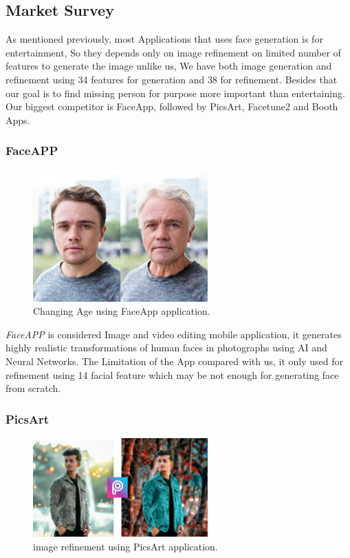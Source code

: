 \subsection{Market Survey}

As mentioned previously, most Applications that uses face generation is for entertainment, So they depends only on image refinement on limited number of features to generate the image unlike us, We have both image generation and refinement using 34 features for generation and 38 for refinement.
Besides that our goal is to find missing person for purpose more important than entertaining. Our biggest competitor is FaceApp, followed by PicsArt, Facetune2 and Booth Apps.
  

\subsubsection{FaceAPP}

\begin{figure}[H]
    \centering
    \includegraphics[width=0.6\textwidth]{images/FaceApp.jpg}
    \caption{Changing Age using FaceApp application.}
    \label{fig:faceApp}
\end{figure}

\emph{FaceAPP} is considered Image and video editing mobile application, it generates highly realistic transformations of human faces in photographs using AI and Neural Networks. 
The Limitation of the App compared with us, it only used for refinement using 14 facial feature which may be not enough for generating face from scratch.

\subsubsection{PicsArt}

\begin{figure}[H]
    \centering
    \includegraphics[width=0.6\textwidth]{images/picsArt.png}
    \caption{image refinement using PicsArt application.}
    \label{fig:picsArt}
\end{figure}

